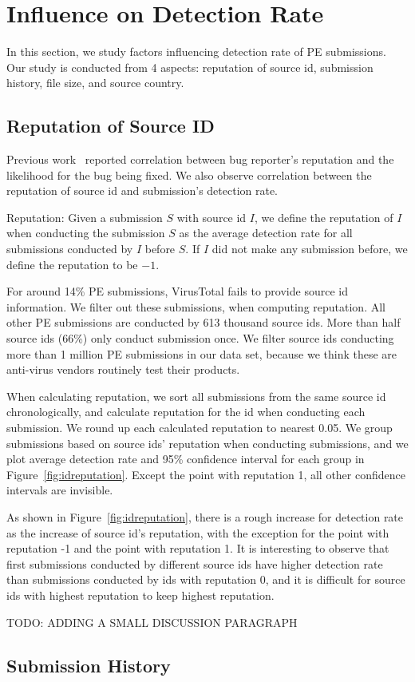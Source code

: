 \section{Influence on Detection Rate}
\label{sec:corr}
In this section, we study factors influencing detection rate of PE submissions. 
Our study is conducted from 4 aspects: reputation of source id, submission history, 
file size, and source country.

\subsection{Reputation of Source ID}




Previous work~\cite{GuoICSE2010} reported correlation between bug reporter’s reputation and the likelihood for the bug being fixed. 
We also observe correlation between the reputation of source id and submission’s detection rate. 

\begin{definition}{Reputation:}
Given a submission $S$ with source id $I$, 
we define the reputation of $I$ when conducting the submission $S$ as the average detection rate for all submissions conducted by $I$ before $S$. 
If $I$ did not make any submission before, we define the reputation to be $-1$. 
\end{definition}

For around 14\% PE submissions, VirusTotal fails to provide source id information. 
We filter out these submissions, when computing reputation.
All other PE submissions are conducted by 613 thousand source ids. 
More than half source ids (66\%) only conduct submission once. 
We filter source ids conducting more than 1 million PE submissions in our data set, 
because we think these are anti-virus vendors routinely test their products. 

When calculating reputation, we sort all submissions from the same source id chronologically, 
and calculate reputation for the id when conducting each submission. 
We round up each calculated reputation to nearest 0.05. 
We group submissions based on source ids' reputation when conducting submissions, 
and we plot average detection rate and 95\% confidence interval for each group in Figure~\ref{fig:idreputation}. 
Except the point with reputation 1, all other confidence intervals are invisible.  

As shown in Figure~\ref{fig:idreputation}, 
there is a rough increase for detection rate as the increase of source id's reputation, 
with the exception for the point with reputation -1 and the point with reputation 1. 
It is interesting to observe that first submissions conducted by different source ids have higher 
detection rate than submissions conducted by ids with reputation 0, 
and it is difficult for source ids with highest reputation to keep highest reputation.  

{\color{red} TODO: ADDING A SMALL DISCUSSION PARAGRAPH}

\subsection{Submission History}

